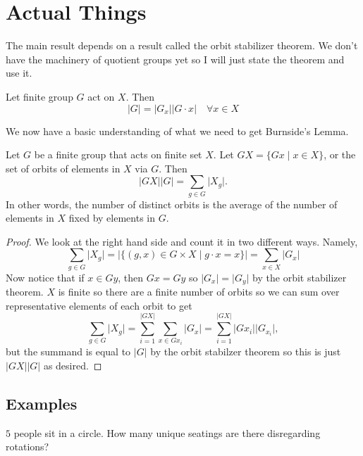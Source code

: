 \documentclass[letterpaper]{article}
\begin{document}
\section{Actual Things}
The main result depends on a result called the orbit stabilizer theorem.  We
don't have the machinery of quotient groups yet so I will just state the theorem
and use it.

\begin{thm}
Let finite group $G$ act on $X$. Then
\[ \lvert G \rvert = \lvert G_x \rvert \lvert G \cdot x \rvert \quad \forall x
\in X \]
\end{thm}

We now have a basic understanding of what we need to get Burnside's Lemma.

\begin{lem}
Let $G$ be a finite group that acts on finite set $X$. Let $GX = \lbrace Gx \mid
x \in X \rbrace$, or the set of orbits of elements in $X$ via $G$. Then
\[ \lvert GX \rvert \lvert G \rvert = \sum_{g \in G} \lvert X_g \rvert.  \]
In other words, the number of distinct orbits is the average of the number of
elements in $X$ fixed by elements in $G$.
\end{lem}

\begin{proof}
We look at the right hand side and count it in two different ways. Namely,
\[ \sum_{g \in G} \lvert X_g \rvert = \lvert \lbrace (g, x) \in G \times X \mid
g \cdot x = x \rbrace \rvert = \sum_{x \in X} \lvert G_x \rvert \]
Now notice that if $x \in Gy$, then $Gx = Gy$ so $\lvert G_x \rvert = \lvert G_y
\rvert$ by the orbit stabilizer theorem. $X$ is finite so there are a finite
number of orbits so we can sum over representative elements of each orbit to get
\[ \sum_{g \in G} \lvert X_g \rvert = \sum_{i = 1}^{\lvert GX \rvert} \sum_{x
\in Gx_i} \lvert G_x \rvert = \sum_{i = 1}^{\lvert GX \rvert} \lvert Gx_i \rvert
\lvert G_{x_i} \rvert, \]
but the summand is equal to $\lvert G \rvert$ by the orbit stabilzer theorem so
this is just $\lvert GX \rvert \lvert G \rvert$ as desired.
\end{proof}

\subsection{Examples}

\begin{ex}
$5$ people sit in a circle. How many unique seatings are there disregarding
rotations?
\end{ex}
\end{document}
